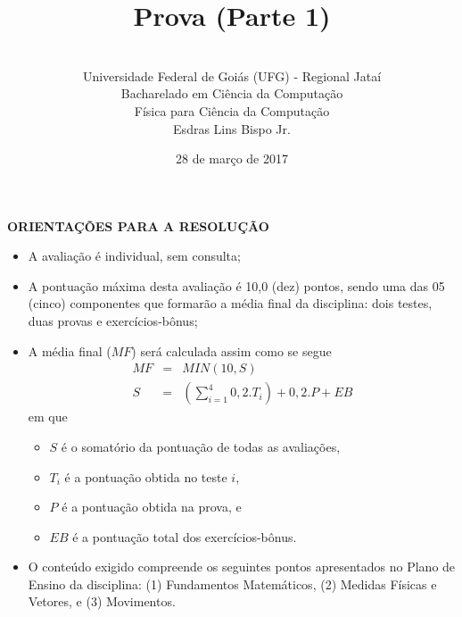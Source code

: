 \documentclass[12pt,a4paper,oneside]{article}
\author{\\Universidade Federal de Goiás (UFG) - Regional Jataí\\Bacharelado em Ciência da Computação \\Física para Ciência da Computação \\Esdras Lins Bispo Jr.}
\title{\sc \huge Prova (Parte 1)}
\date{28 de março de 2017}
\begin{document}
\maketitle

{\bf ORIENTAÇÕES PARA A RESOLUÇÃO}

\footnotesize

\begin{itemize}
	\item A avaliação é individual, sem consulta;
	\item A pontuação máxima desta avaliação é 10,0 (dez) pontos, sendo uma das 05 (cinco) componentes que formarão a média final da disciplina: dois testes, duas provas e exercícios-bônus;
	\item A média final ($MF$) será calculada assim como se segue
	\begin{eqnarray}
		MF & = & MIN(10, S) \nonumber \\
		S & = & (\sum_{i=1}^{4} 0,2.T_i ) + 0,2.P  + EB \nonumber
	\end{eqnarray}
	em que 
	\begin{itemize}
		\item $S$ é o somatório da pontuação de todas as avaliações,
		\item $T_i$ é a pontuação obtida no teste $i$,
		\item $P$ é a pontuação obtida na prova, e
		\item $EB$ é a pontuação total dos exercícios-bônus.
	\end{itemize}
	\item O conteúdo exigido compreende os seguintes pontos apresentados no Plano de Ensino da disciplina: (1) Fundamentos Matemáticos, (2) Medidas Físicas e Vetores, e (3) Movimentos.
\end{itemize}


\begin{center}
\end{center}

\newpage

\normalsize
\end{document}
